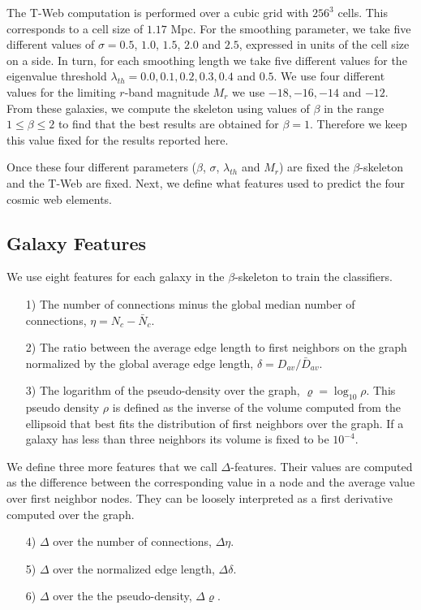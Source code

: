 \documentclass[usenatbib]{mnras}
\begin{document}
The T-Web computation is performed over a cubic grid with $256^3$
cells. 
This corresponds to a cell size of $1.17$ Mpc.
For the smoothing parameter, we take five different values of $\sigma =
0.5$, $1.0$, $1.5$, $2.0$ and $2.5$, expressed in units of the cell size on a side.
In turn, for each smoothing length we take five different values for
the eigenvalue threshold
$\lambda_{th}=0.0, 0.1, 0.2, 0.3, 0.4$ and $0.5$. 
We use four different values for the limiting $r$-band magnitude
$M_{r}$ we use  $-18, -16, -14$ and $-12$.
From these galaxies, we compute the skeleton using values of $\beta$ in
the range $1\leq \beta \leq 2$ to find that the best results are
obtained for $\beta=1$.   
Therefore we keep this value fixed for the results reported here.

Once these four different parameters ($\beta$,
$\sigma$, $\lambda_{th}$ and $M_{r}$) are fixed the $\beta$-skeleton and the
T-Web are fixed.  
Next, we define what features used to predict the four cosmic web elements.

\subsection{Galaxy Features}
We use eight features for each galaxy in the $\beta$-skeleton to train the classifiers. 

\begin{enumerate}
\item[1)]
The number of connections minus the global median number of
connections, $\eta = N_c - \bar{N}_c$. 
\item[2)]
The ratio between the average edge length to first neighbors on the graph
normalized by the global average edge length, $\delta=D_{av}/\bar{D}_{av}$. 
\item[3)] 
The logarithm of the pseudo-density over the graph,
  $\varrho=\log_{10}\rho$.   
This pseudo density $\rho$ is defined as the inverse of the volume
computed from the ellipsoid that best fits the distribution of first
neighbors over the graph. 
If a galaxy has less than three neighbors its volume is fixed to be $10^{-4}$.
\end{enumerate}
\noindent
We define three more features that we call $\Delta$-features.
Their values are computed as the difference between the corresponding
value in a node and the average value over first neighbor nodes.  
They can be loosely interpreted as a first derivative computed over the graph. 

\begin{enumerate}
\item[4)] $\Delta$ over the number of connections, $\Delta\eta$.
\item[5)] $\Delta$ over the normalized edge length, $\Delta\delta$.
\item[6)] $\Delta$ over the the pseudo-density, $\Delta\varrho$.
\end{enumerate}
\end{document}
